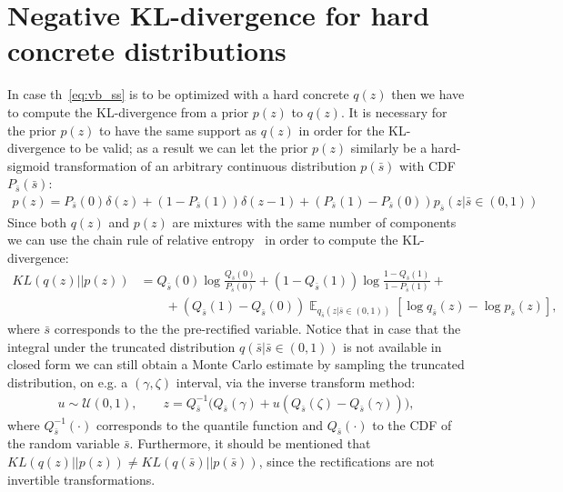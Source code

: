 \documentclass{article} %
\DeclareMathOperator{\E}{\mathbb{E}}
\begin{document}
\section{Negative KL-divergence for hard concrete distributions}\label{app:kl_hc}
In case th~\ref{eq:vb_ss} is to be optimized with a hard concrete $q(z)$ then we have to compute the KL-divergence from a prior $p(z)$ to $q(z)$. It is necessary for the prior $p(z)$ to have the same support as $q(z)$ in order for the KL-divergence to be valid; as a result we can let the prior $p(z)$ similarly be a hard-sigmoid transformation of an arbitrary continuous distribution $p(\bar{s})$ with CDF $P_{\bar{s}}(\bar{s})$:
\begin{align}
    p(z) = P_{\bar{s}}(0)\delta(z) + (1 - P_{\bar{s}}(1))\delta(z - 1) + (P_{\bar{s}}(1) - P_{\bar{s}}(0))p_{\bar{s}}(z|\bar{s} \in (0, 1))
\end{align}
Since both $q(z)$ and $p(z)$ are mixtures with the same number of components we can use the chain rule of relative entropy~\citep{cover2012elements,hershey2007approximating} in order to compute the KL-divergence:
\begin{align}
    KL(q(z) || p(z)) &= Q_{\bar{s}}(0)\log \frac{Q_{\bar{s}}(0)}{P_{\bar{s}}(0)} +  (1 - Q_{\bar{s}}(1))\log \frac{1 - Q_{\bar{s}}(1)}{1 - P_{\bar{s}}(1)} + \nonumber\\&\qquad + (Q_{\bar{s}}(1) - Q_{\bar{s}}(0)) \E_{q_{\bar{s}}(z|\bar{s} \in (0, 1))}[\log q_{\bar{s}}(z) - \log p_{\bar{s}}(z)],
\end{align}
where $\bar{s}$ corresponds to the the pre-rectified variable. Notice that in case that the integral under the truncated distribution $q(\bar{s}|\bar{s} \in (0, 1))$ is not available in closed form we can still obtain a Monte Carlo estimate by sampling the truncated distribution, on e.g. a $(\gamma, \zeta)$ interval, via the inverse transform method:
\begin{align}
	u \sim \mathcal{U}(0, 1), \qquad z = Q^{-1}_{\bar{s}}\big(Q_{\bar{s}}(\gamma) + u (Q_{\bar{s}}(\zeta) - Q_{\bar{s}}(\gamma))\big),
\end{align}
where $Q^{-1}_{\bar{s}}(\cdot)$ corresponds to the quantile function and $Q_{\bar{s}}(\cdot)$ to the CDF of the random variable $\bar{s}$. Furthermore, it should be mentioned that $KL(q(z) || p(z)) \neq KL(q(\bar{s}) ||p(\bar{s}))$, since the rectifications are not invertible transformations.
\end{document}
